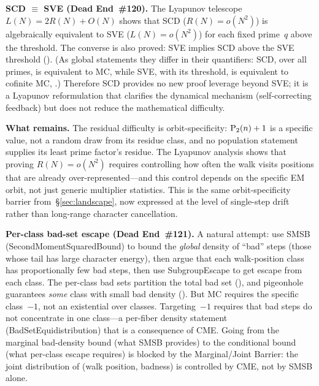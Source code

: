 \medskip
\noindent\textbf{SCD $\equiv$ SVE (Dead End~\#120).}\enspace
The Lyapunov telescope $L(N) = 2R(N) + O(N)$ shows that SCD
($R(N) = o(N^2)$) is algebraically equivalent to SVE ($L(N) = o(N^2)$)
for each fixed prime~$q$ above the threshold.  The converse is also
proved: SVE implies SCD above the SVE threshold
().
(As global statements they differ in their quantifiers: SCD, over all
primes, is equivalent to MC, while SVE, with its threshold, is
equivalent to cofinite MC,
.)
Therefore SCD provides no new proof leverage beyond SVE; it is a
Lyapunov reformulation that clarifies the dynamical mechanism
(self-correcting feedback) but does not reduce the mathematical
difficulty.

\medskip
\noindent\textbf{What remains.}\enspace
The residual difficulty is orbit-specificity: $\mathrm{P}_{2}(n) + 1$ is a
specific value, not a random draw from its residue class, and no
population statement supplies its least prime factor's residue.  The Lyapunov analysis shows that proving
$R(N) = o(N^2)$ requires controlling how often the walk visits
positions that are already over-represented---and this control depends
on the specific EM orbit, not just generic multiplier statistics.
This is the same orbit-specificity barrier
from~\S\ref{sec:landscape}, now expressed at the level of single-step
drift rather than long-range character cancellation.

\medskip
\noindent\textbf{Per-class bad-set escape (Dead End~\#121).}\enspace
A natural attempt: use SMSB (SecondMomentSquaredBound) to bound the
\emph{global} density of ``bad'' steps (those whose tail has large
character energy), then argue that each walk-position class has
proportionally few bad steps, then use SubgroupEscape to get escape
from each class.  The per-class bad sets partition the total bad set
(),
and pigeonhole guarantees \emph{some} class with small bad density
().
But MC requires the specific class~$-1$, not an existential over
classes.  Targeting~$-1$ requires that bad steps do not concentrate
in one class---a per-fiber density statement
(BadSetEquidistribution) that is a consequence of CME\@.  Going from
the marginal bad-density bound (what SMSB provides) to the conditional
bound (what per-class escape requires) is blocked by the
Marginal/Joint Barrier: the joint distribution of (walk position,
badness) is controlled by CME, not by SMSB alone.

